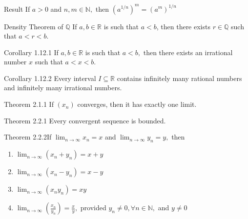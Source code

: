 \documentclass[10pt,landscape]{article}
\makeatletter
\renewcommand{\section}{\@startsection{section}{1}{0mm}%
                                {-1ex plus -.5ex minus -.2ex}%
                                {0.5ex plus .2ex}%
                                {\normalfont\large\bfseries}}
\theoremstyle{definition}
\newcommand{\thistheoremname}{}
\newtheorem*{genericthm*}{\thistheoremname}
\newenvironment{namedthm*}[1]
{\renewcommand{\thistheoremname}{#1}\begin{genericthm*}}
{\end{genericthm*}}
\makeatother
\begin{document}
\begin{multicols}{3}
	\begin{namedthm*}{Result}
		If \(a>0\) and \(n, m \in \mathbb{N},\) then
		\(
			\left(a^{1 / n}\right)^{m}=\left(a^{m}\right)^{1 / n}
		\)
	\end{namedthm*}

	\begin{namedthm*}{Density Theorem of \(\mathbb{Q}\)}
		If \(a, b \in \mathbb{R}\) is such that \(a<b\), then there exists \(r \in \mathbb{Q}\) such that
		\(a<r<b .\)
	\end{namedthm*}

	\begin{namedthm*}{Corollary 1.12.1}
		If \(a, b \in \mathbb{R}\) is such that \(a<b,\) then there exists an irrational number \(x\)
		such that \(a<x<b .\)
	\end{namedthm*}

	\begin{namedthm*}{Corollary 1.12.2}
		Every interval \(I \subseteq \mathbb{R}\) contains infinitely many rational numbers and infinitely many irrational numbers.
	\end{namedthm*}


	\begin{namedthm*}{Theorem 2.1.1}
		If \(\left(x_{n}\right)\) converges, then it has exactly one limit.
	\end{namedthm*}

	\begin{namedthm*}{Theorem 2.2.1}
		Every convergent sequence is bounded.
	\end{namedthm*}

	\begin{namedthm*}{Theorem 2.2.2}If \(\lim _{n \rightarrow \infty} x_{n}=x\) and \(\lim _{n \rightarrow \infty} y_{n}=y,\) then
		~
		\begin{enumerate}
			\item \(\lim _{n \rightarrow \infty}\left(x_{n}+y_{n}\right)=x+y\)
			\item \(\lim _{n \rightarrow \infty}\left(x_{n}-y_{n}\right)=x-y\)
			\item \(\lim _{n \rightarrow \infty}\left(x_{n} y_{n}\right)=x y\)
			\item \(\lim _{n \rightarrow \infty}\left(\frac{x_{n}}{y_{n}}\right)=\frac{x}{y},\) provided \(y_{n} \neq 0, \forall n \in \mathbb{N},\) and \(y \neq 0\)
		\end{enumerate}
	\end{namedthm*}


\end{multicols}
\end{document}
